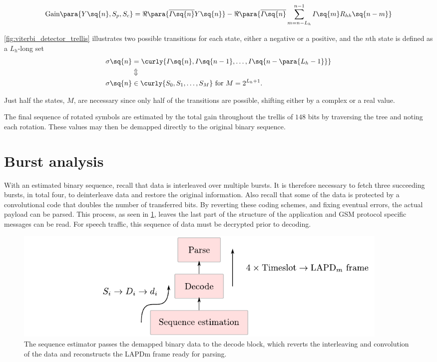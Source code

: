 \begin{equation}
  \text{Gain} \para{Y\sq{n}, S_p, S_c} = \Re \para{\overline{I \sq{n}}Y \sq{n}} -
  \Re \para{\overline{I \sq{n}} \sum\limits_{m=n-L_h}^{n - 1} I \sq{m}
    R_{hh}\sq{n - m}}
  \label{eq:gain}
\end{equation}

\cref{fig:viterbi_detector_trellis} illustrates two possible
transitions for each state, either a negative or a positive, and the
$n$th state is defined as a $L_h$-long set
\begin{equation}
  \begin{aligned}
    \sigma \sq{n} &=
      \curly{I \sq{n}, I \sq{n - 1}, \dots, I \sq{n - \para{L_h -
            1}}}\\
      &\Updownarrow\\
      \sigma \sq{n} &\in \curly{S_0, S_1, \dots, S_M} \text{ for } M = 2^{L_h + 1}.
  \end{aligned}
\end{equation}

Just half the states, $M$, are necessary since only half of the
transitions are possible, shifting either by a complex or a real
value.

The final sequence of rotated symbols are estimated by the total gain
throughout the trellis of $148$ bits by traversing the tree and noting
each rotation. These values may then be demapped directly to the
original binary sequence.

\section{Burst analysis}
With an estimated binary sequence, recall that data is interleaved
over multiple bursts. It is therefore necessary to fetch three
succeeding bursts, in total four, to deinterleave data and restore the
original information. Also recall that some of the data is protected
by a convolutional code that doubles the number of transferred
bits. By reverting these coding schemes, and fixing eventual errors,
the actual payload can be parsed. This process, as seen in
\cref{fig:burst_analysis}, leaves the last part of the structure of
the application and \gls{GSM} protocol specific messages can be
read. For speech traffic, this sequence of data must be decrypted
prior to decoding.

\begin{figure}
  \centering
  \includegraphics[width=0.9\textwidth]{figures/burst_analysis}
  \caption{The sequence estimator passes the demapped binary data to
    the decode block, which reverts the interleaving and convolution
    of the data and reconstructs the LAPDm frame ready for
    parsing.}
  \label{fig:burst_analysis}
\end{figure}

